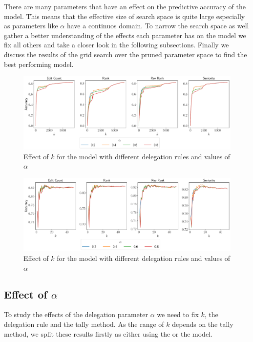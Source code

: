 There are many parameters that have an effect on the predictive accuracy of the model. This means that the effective size of search space is quite large especially as parameters like $\alpha$ have a continuos domain. To narrow the search space as well gather a better understanding of the effects each parameter has on the model we fix all others and take a closer look in the following subsections. Finally we discuss the results of the grid search over the pruned parameter space to find the best performing model.

\begin{figure}[t]
    \centering
    \includegraphics[width=\linewidth]{images/k_global.pdf}
    \caption{Effect of $k$ for the \globalv model with different delegation rules and values of $\alpha$}
    \label{fig:global-k}
\end{figure}
\begin{figure}[t]
    \centering
    \includegraphics[width=\linewidth]{images/k_local.pdf}
    \caption{Effect of $k$ for the \localv model with different delegation rules and values of $\alpha$}
    \label{fig:local-k}
\end{figure}
\subsection{Effect of $\alpha$}
To study the effects of the delegation parameter $\alpha$ we need to fix $k$, the delegation rule and the tally method. As the range of $k$ depends on the tally method, we split these results firstly as either using the \globalv or the \localv model.
\smallskip

